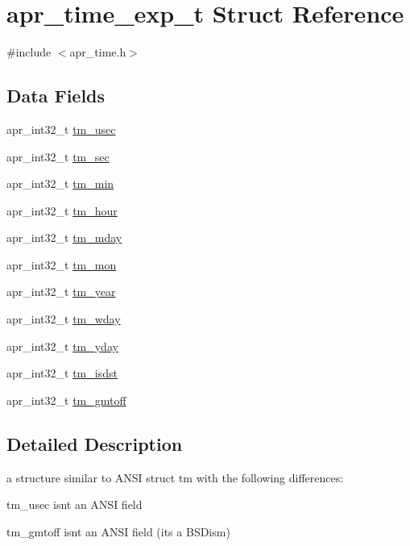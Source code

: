 \hypertarget{structapr__time__exp__t}{}\section{apr\+\_\+time\+\_\+exp\+\_\+t Struct Reference}
\label{structapr__time__exp__t}


{\ttfamily \#include $<$apr\+\_\+time.\+h$>$}

\subsection*{Data Fields}
\begin{DoxyCompactItemize}
\item 
apr\+\_\+int32\+\_\+t \hyperlink{structapr__time__exp__t_ac5f11e3c1f5a30d357df2108296a8d30}{tm\+\_\+usec}
\item 
apr\+\_\+int32\+\_\+t \hyperlink{structapr__time__exp__t_a2c29c99a75b55237917cb05ebae6706c}{tm\+\_\+sec}
\item 
apr\+\_\+int32\+\_\+t \hyperlink{structapr__time__exp__t_a56a380db482ba5b2bef43351faad27fb}{tm\+\_\+min}
\item 
apr\+\_\+int32\+\_\+t \hyperlink{structapr__time__exp__t_a2dbab1d10ed6234c8e9e714e13b7911c}{tm\+\_\+hour}
\item 
apr\+\_\+int32\+\_\+t \hyperlink{structapr__time__exp__t_a6c09a274f011841e9e988c3c9504848a}{tm\+\_\+mday}
\item 
apr\+\_\+int32\+\_\+t \hyperlink{structapr__time__exp__t_a746f38956dfeb6be3bd17282791e3577}{tm\+\_\+mon}
\item 
apr\+\_\+int32\+\_\+t \hyperlink{structapr__time__exp__t_a35c32245be49279a6689e34bcd6e534a}{tm\+\_\+year}
\item 
apr\+\_\+int32\+\_\+t \hyperlink{structapr__time__exp__t_a57e892bbf3c52df34dcff2c6a9f1adbf}{tm\+\_\+wday}
\item 
apr\+\_\+int32\+\_\+t \hyperlink{structapr__time__exp__t_aa15c7ab0d7e2a974e89cc1470f1583ab}{tm\+\_\+yday}
\item 
apr\+\_\+int32\+\_\+t \hyperlink{structapr__time__exp__t_a4d899f1fb9fde3c6b6893941fa81b1c8}{tm\+\_\+isdst}
\item 
apr\+\_\+int32\+\_\+t \hyperlink{structapr__time__exp__t_a1102ca16ed70b1c707473431eed58d7b}{tm\+\_\+gmtoff}
\end{DoxyCompactItemize}


\subsection{Detailed Description}
a structure similar to A\+N\+SI struct tm with the following differences\+:
\begin{DoxyItemize}
\item tm\+\_\+usec isn\textquotesingle{}t an A\+N\+SI field
\item tm\+\_\+gmtoff isn\textquotesingle{}t an A\+N\+SI field (it\textquotesingle{}s a B\+S\+Dism) 
\end{DoxyItemize}

